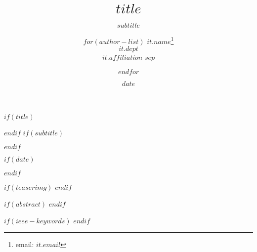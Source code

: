$if(title)$
  \title{$title$}
$endif$
$if(subtitle)$
  \subtitle{$subtitle$}
$endif$
  
\author{%
$for(author-list)$%
  $it.name$\thanks{email: $it.email$}\\\scriptsize $it.dept$\\\scriptsize $it.affiliation$%
  $sep$\and%
$endfor$%
}

$if(date)$
  \date{$date$}
$endif$

$if(teaserimg)$
$endif$

$if(abstract)$
$endif$


$if(ieee-keywords)$
$endif$